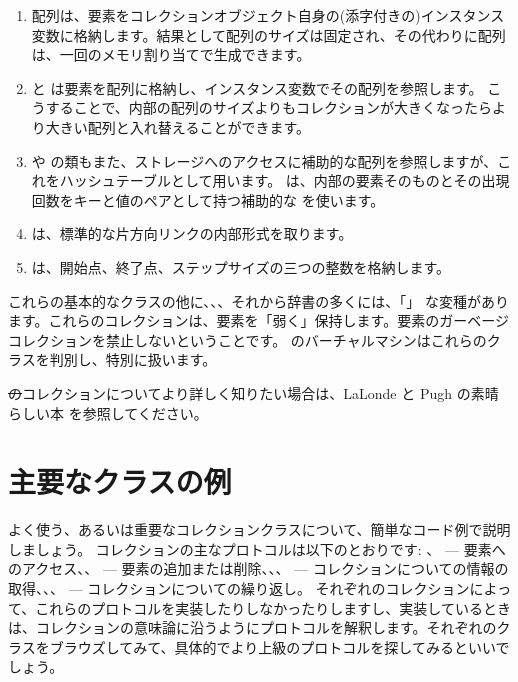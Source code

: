 \documentclass[a4paper,10pt,twoside]{book}
\begin{document}
\begin{enumerate}
  \item 配列は、要素をコレクションオブジェクト自身の(添字付きの)インスタンス変数に格納します。結果として配列のサイズは固定され、その代わりに配列は、一回のメモリ割り当てで生成できます。
  \item {} と  は要素を配列に格納し、インスタンス変数でその配列を参照します。
  こうすることで、内部の配列のサイズよりもコレクションが大きくなったらより大きい配列と入れ替えることができます。
  \item {} や  の類もまた、ストレージへのアクセスに補助的な配列を参照しますが、これをハッシュテーブルとして用います。 は、内部の要素そのものとその出現回数をキーと値のペアとして持つ補助的な  を使います。
  \item {} は、標準的な片方向リンクの内部形式を取ります。
  \item {} は、開始点、終了点、ステップサイズの三つの整数を格納します。
\end{enumerate}
これらの基本的なクラスの他に、、、それから辞書の多くには、「」 な変種があります。これらのコレクションは、要素を「弱く」保持します。\ie 要素のガーベージコレクションを禁止しないということです。
\pharo のバーチャルマシンはこれらのクラスを判別し、特別に扱います。

\st のコレクションについてより詳しく知りたい場合は、LaLonde と Pugh の素晴らしい本\cite{LaLo90a} を参照してください。

\section{主要なクラスの例}
よく使う、あるいは重要なコレクションクラスについて、簡単なコード例で説明しましょう。
コレクションの主なプロトコルは以下のとおりです: 、 --- 要素へのアクセス、、 --- 要素の追加または削除、、、 --- コレクションについての情報の取得、、、 --- コレクションについての繰り返し。
それぞれのコレクションによって、これらのプロトコルを実装したりしなかったりしますし、実装しているときは、コレクションの意味論に沿うようにプロトコルを解釈します。それぞれのクラスをブラウズしてみて、具体的でより上級のプロトコルを探してみるといいでしょう。
\end{document}
